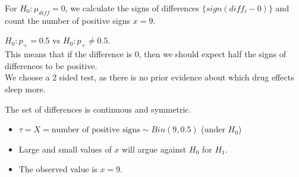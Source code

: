\documentclass[t,xcolor=pdftex,dvipsnames,table]{beamer}\usepackage[]{graphicx}\usepackage[]{color}
\begin{document}
\begin{frame}[fragile]{}

For $H_{0}: \mu_{diff} = 0$, we calculate the signs of differences $\{ sign(diff_{i}-0) \}$  and count the number of positive signs $x=9$.

\vspace{.5cm}
$H_{0}: p_{+} = 0.5$ vs $H_{0}: p_{+} \neq 0.5$.  \\
This means that if the difference is 0, then we should expect half the signs of differences to be positive.\\
We choose a 2 sided test, as there is no prior evidence about which drug effects sleep more.

\vspace{.5cm}
 The set of differences is continuous and symmetric.

\vspace{.5cm}
\begin{itemize}
\item $\tau = X =  \mbox{number of positive signs} \sim Bin(9,0.5)$ (under $H_{0}$) 
\item Large and small values of $x$ will argue against $H_{0}$ for $H_{1}$. \\
\item The observed value is $x=9$. 
\end{itemize}
\end{frame}
\end{document}

